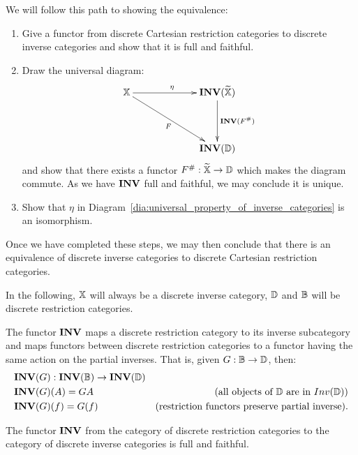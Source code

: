 We will follow this path to showing the equivalence:
\begin{enumerate}
\item Give a functor \Invf from discrete Cartesian restriction categories to discrete inverse
  categories and show that it is full and faithful.
\item Draw the universal diagram:
\begin{equation}
  \xymatrix @C=65pt @R=40pt{
    \X \ar[r]^{\eta} \ar[rd]_{F}& \Inv{\Xt} \ar[d]^{\Inv{F^{\#}}}\\
    &\Inv{\D}
  }
  \label{dia:universal_property_of_inverse_categories}
\end{equation}
and show that there exists a functor $F^{\#}:\widetilde{\mathbb{X}} \to \mathbb{D}$ which makes the diagram commute. As we have
$\mathbf{INV}$ full and faithful, we may conclude it is unique.
\item Show that $\eta$ in Diagram~\ref{dia:universal_property_of_inverse_categories} is an isomorphism.
\end{enumerate}
Once we have completed these steps, we may then conclude that there is an equivalence of discrete
inverse categories to discrete Cartesian restriction categories.

In the following, $\mathbb{X}$
will always be a discrete inverse category, $\mathbb{D}$ and $\mathbb{B}$ will be discrete restriction categories.

The functor $\mathbf{INV}$ maps a discrete restriction category to its inverse subcategory and
maps functors between discrete restriction categories to a functor having the same action on the
partial inverses. That is, given $G:\mathbb{B} \to \mathbb{D}$, then:
\begin{align*}
  &\mathbf{INV}({G}): \mathbf{INV}({\mathbb{B}}) \to \mathbf{INV}({\mathbb{D}})\\
  &\mathbf{INV}({G})(A) = G{A}&\text{(all objects of $\mathbb{D}$ are in $Inv(\mathbb{D})$)}\\
  &\mathbf{INV}({G})(f) = G(f)&\text{(restriction functors preserve partial inverse)}.
\end{align*}
\begin{lemma}\label{lem:inv_is_full_and_faithful}
  The functor $\mathbf{INV}$ from the category of discrete restriction categories to the category of
  discrete inverse categories is full and faithful.
\end{lemma}

